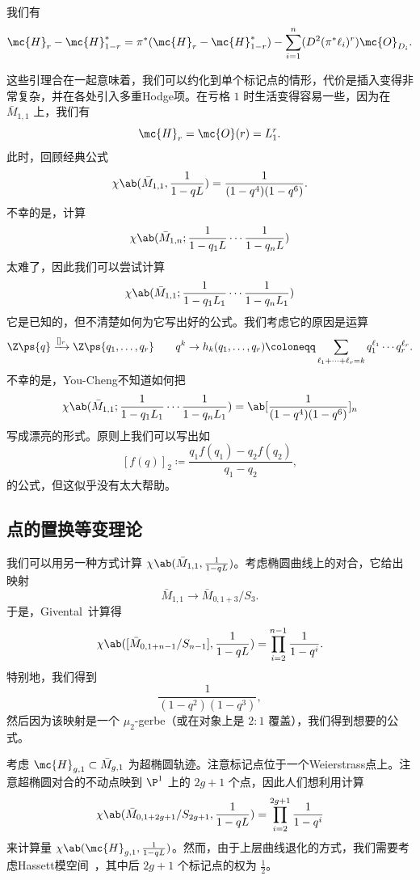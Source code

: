 \begin{lem}
    我们有
    \[ \mc{H}_r - \mc{H}_{1-r}^* = \pi^* (\mc{H}_r - \mc{H}_{1-r}^*) - \sum_{i=1}^n (D^2 (\pi^* \ell_i)^r) \mc{O}_{D_i}. \]
\end{lem}

这些引理合在一起意味着，我们可以约化到单个标记点的情形，代价是插入变得非常复杂，并在各处引入多重Hodge项。在亏格 \(1\) 时生活变得容易一些，因为在 \(\bar{M}_{1,1}\) 上，我们有
\[ \mc{H}_r = \mc{O}(r) = L_1^r. \]
此时，回顾经典公式
\[ \chi\ab(\bar{M}_{1,1}, \frac{1}{1-qL}) = \frac{1}{(1-q^4)(1-q^6)}. \]
不幸的是，计算
\[ \chi\ab(\bar{M}_{1,n}; \frac{1}{1-q_1 L} \cdots \frac{1}{1-q_n L}) \]
太难了，因此我们可以尝试计算
\[ \chi\ab(\bar{M}_{1,1}; \frac{1}{1-q_1 L_1} \cdots \frac{1}{1-q_n L_1})  \]
它是已知的，但不清楚如何为它写出好的公式。我们考虑它的原因是运算
\[ \Z\ps{q} \xrightarrow{[]_r} \Z\ps{q_1, \ldots, q_r} \qquad q^k \to h_k(q_1, \ldots, q_r) \coloneqq \sum_{\ell_1 + \cdots + \ell_r = k} q_1^{\ell_1} \cdots q_r^{\ell_r}. \]
不幸的是，You-Cheng不知道如何把
\[ \chi\ab(\bar{M}_{1,1}; \frac{1}{1-q_1 L_1} \cdots \frac{1}{1-q_n L_1}) = \ab[\frac{1}{(1-q^4)(1-q^6)}]_n \]
写成漂亮的形式。原则上我们可以写出如
\[ [f(q)]_2 \coloneqq \frac{q_1 f(q_1) - q_2 f(q_2)}{q_1 - q_2}, \]
的公式，但这似乎没有太大帮助。

\subsection{点的置换等变理论}%
\label{sub:Permutation-equivariant theory of a point}

我们可以用另一种方式计算 \(\chi\ab(\bar{M}_{1,1}, \frac{1}{1-q L})\)。考虑椭圆曲线上的对合，它给出映射
\[ \bar{M}_{1,1} \to \bar{M}_{0,1+3}/S_3. \]
于是，Givental~\cite{Givental2017K1}计算得
\[ \chi\ab([\bar{M}_{0,1+n-1}/S_{n-1}], \frac{1}{1-qL}) = \prod_{i=2}^{n-1} \frac{1}{1-q^i}. \]
特别地，我们得到
\[ \frac{1}{(1-q^2)(1-q^3)}, \]
然后因为该映射是一个 \(\mu_2\)-gerbe（或在对象上是 \(2:1\) 覆盖），我们得到想要的公式。

考虑 \(\mc{H}_{g,1} \subset \bar{M}_{g,1}\) 为超椭圆轨迹。注意标记点位于一个Weierstrass点上。注意超椭圆对合的不动点映到 \(\P^1\) 上的 \(2g+1\) 个点，因此人们想利用计算
\[ \chi\ab(\bar{M}_{0,1+2g+1}/S_{2g+1}, \frac{1}{1-q L}) = \prod_{i=2}^{2g+1} \frac{1}{1-q^i} \]
来计算量
\(\chi\ab(\mc{H}_{g,1}, \frac{1}{1-qL})\)。然而，由于上层曲线退化的方式，我们需要考虑Hassett模空间~\cite{Hassett2003}，其中后 \(2g+1\) 个标记点的权为 \(\frac{1}{2}\)。
